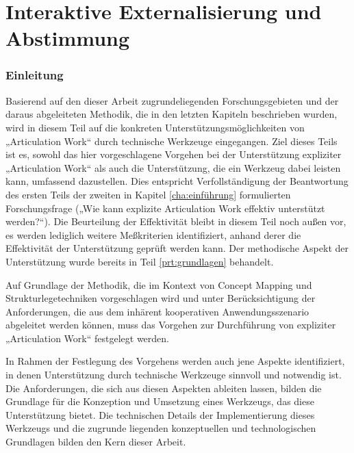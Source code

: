 \part{Interaktive Externalisierung und Abstimmung} %
\label{prt:umsetzung}

\section*{Einleitung} %
\label{sec:umsetzung_einleitung}


Basierend auf den dieser Arbeit zugrundeliegenden Forschungsgebieten und der daraus abgeleiteten Methodik, die in den letzten Kapiteln beschrieben wurden, wird in diesem Teil auf die konkreten Unterstützungsmöglichkeiten von „Articulation Work“ durch technische Werkzeuge eingegangen. Ziel dieses Teils ist es, sowohl das hier vorgeschlagene Vorgehen bei der Unterstützung expliziter „Articulation Work“ als auch die Unterstützung, die ein Werkzeug dabei leisten kann, umfassend dazustellen. Dies entspricht Verfollständigung der Beantwortung des ersten Teils der zweiten in Kapitel \ref{cha:einführung} formulierten Forschungsfrage („Wie kann explizite Articulation Work effektiv unterstützt werden?“). Die Beurteilung der Effektivität bleibt in diesem Teil noch außen vor, es werden lediglich weitere Meßkriterien identifiziert, anhand derer die Effektivität der Unterstützung geprüft werden kann. Der methodische Aspekt der Unterstützung wurde bereits in Teil \ref{prt:grundlagen} behandelt.

Auf Grundlage der Methodik, die im Kontext von Concept Mapping und Strukturlegetechniken vorgeschlagen wird und unter Berücksichtigung der Anforderungen, die aus dem inhärent kooperativen Anwendungsszenario abgeleitet werden können, muss das Vorgehen zur Durchführung von expliziter „Articulation Work“ festgelegt werden. 

In Rahmen der Festlegung des Vorgehens werden auch jene Aspekte identifiziert, in denen Unterstützung durch technische Werkzeuge sinnvoll und notwendig ist. Die Anforderungen, die sich aus diesen Aspekten ableiten lassen, bilden die Grundlage für die Konzeption und Umsetzung eines Werkzeugs, das diese Unterstützung bietet. Die technischen Details der Implementierung dieses Werkzeugs und die zugrunde liegenden konzeptuellen und technologischen Grundlagen bilden den Kern dieser Arbeit.

